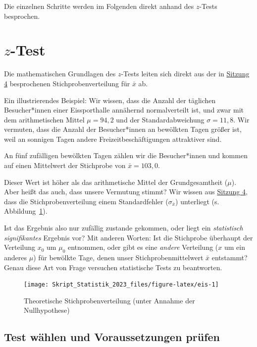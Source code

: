 \documentclass[
  11pt,
  ngerman,
  a4paper,
]{report}
\begin{document}
Die einzelnen Schritte werden im Folgenden direkt anhand des \(z\)-Tests besprochen.

\hypertarget{z-test}{%
\section{\texorpdfstring{\(z\)-Test}{z-Test}}\label{z-test}}

Die mathematischen Grundlagen des \(z\)-Tests leiten sich direkt aus der in \protect\hyperlink{stichprobenverteilung}{Sitzung 4} besprochenen Stichprobenverteilung für \(\bar{x}\) ab.

Ein illustrierendes Beispiel: Wir wissen, dass die Anzahl der täglichen Besucher*innen einer Eissporthalle annähernd normalverteilt ist, und zwar mit dem arithmetischen Mittel \(\mu=94{,}2\) und der Standardabweichung \(\sigma=11{,}8\). Wir vermuten, dass die Anzahl der Besucher*innen an bewölkten Tagen größer ist, weil an sonnigen Tagen andere Freizeitbeschäftigungen attraktiver sind.

An fünf zufälligen bewölkten Tagen zählen wir die Besucher*innen und kommen auf einen Mittelwert der Stichprobe von \(\bar{x} = 103{,}0\).

Dieser Wert ist höher als das arithmetische Mittel der Grundgesamtheit (\(\mu\)). Aber heißt das auch, dass unsere Vermutung stimmt? Wir wissen aus \protect\hyperlink{stichprobenverteilung}{Sitzung 4}, dass die Stichprobenverteilung einem Standardfehler (\(\sigma_{\bar{x}}\)) unterliegt (s. Abbildung~\ref{fig:eis}).

Ist das Ergebnis also nur zufällig zustande gekommen, oder liegt ein \emph{statistisch signifikantes} Ergebnis vor? Mit anderen Worten: Ist die Stichprobe überhaupt der Verteilung \(x_0\) um \(\mu_0\) entnommen, oder gibt es eine \emph{andere} Verteilung (\(x\) um ein anderes \(\mu\)) für bewölkte Tage, denen unser Stichprobenmittelwert \(\bar{x}\) entstammt? Genau diese Art von Frage versuchen statistische Tests zu beantworten.

\begin{figure}[!h]

{\centering \texttt{[image: Skript\_Statistik\_2023\_files/figure-latex/eis-1]} 

}

\caption{Theoretische Stichprobenverteilung (unter Annahme der Nullhypothese)}\label{fig:eis}
\end{figure}

\hypertarget{test-wuxe4hlen-und-voraussetzungen-pruxfcfen}{%
\subsection{Test wählen und Voraussetzungen prüfen}\label{test-wuxe4hlen-und-voraussetzungen-pruxfcfen}}
\end{document}
